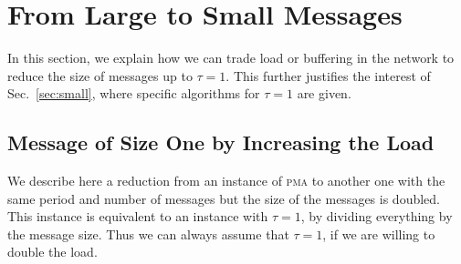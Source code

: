 \documentclass[a4paper,cleveref, autoref, thm-restate,UKenglish]{lipics-v2019}
\newcommand\pma{\textsc{pma}\xspace}
\begin{document}
\section{From Large to Small Messages}\label{sec:reduction}



In this section, we explain how we can trade load or buffering in the network to reduce the size of messages up to $\tau = 1$. This further justifies the interest of Sec.~\ref{sec:small}, where specific algorithms for $\tau = 1$ are given.

\subsection{Message of Size One by Increasing the Load}

We describe here a reduction from an instance of \pma to another one with the same period and number of messages but 
the size of the messages is doubled. This instance is equivalent to an instance with $\tau = 1$, by dividing everything by the message size. Thus we can always assume that $\tau = 1$, if we are willing to double the load.
\end{document}
